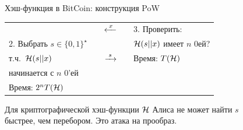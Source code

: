 \documentclass[usenames,dvipsnames,8pt,aspectratio=169]{beamer}
\begin{document}
\begin{frame}{Хэш-функция в  BitCoin: конструкция PoW}
\begin{tabular}{l c c c l}
&  & \Huge $\xleftarrow{\mkern5mu x \mkern5mu}$ & &  3. Проверить: \\ [2pt]
2. Выбрать $s \in \{0,1\}^\star$   & & &  & $\mathcal{H}(s||x)$  имеет $n$ 0ей?  \\[-6pt]
т.ч.\ $\mathcal{H}(s||x)$ & & \Huge $\xrightarrow{\mkern5mu s \mkern5mu}$  &  &  {\color{Orange}  Время: $T(\mathcal{H}) $}  \\
начинается с $n$ 0'ей & & &  &  \\[4pt]
{\color{Orange}  Время: $2^n T(\mathcal{H}) $} & & &  & 
\end{tabular}

\vspace{15pt}
Для криптографической хэш-функции $\mathcal{H}$ Алиса не может найти $s$ \\ быстрее, чем перебором. Это атака на прообраз. 
\end{frame}
\end{document}
